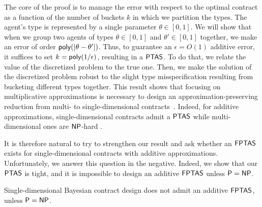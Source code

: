 The core of the proof is to manage the error with respect to the optimal contract as a function of the number of buckets $k$ in which we partition the types.
The agent's type is represented by a single parameter $\theta\in [0,1]$. 
We will show that when we group two agents of types $\theta \in [0,1]$ and $\theta'\in [0,1]$ together, we make an error of order $\textsf{poly}(|\theta-\theta'|)$. Thus, to guarantee an $\epsilon=O(1)$ additive error, it suffices to set $k=\textsf{poly}(1/\epsilon)$, resulting in a $\textsf{PTAS}$. 
To do that, we relate the value of the discretized problem to the true one. Then, we make the solution of the discretized problem robust to the slight type misspecification resulting from bucketing different types together.
%
%
This result shows that focusing on multiplicative approximations is necessary to design an approximation-preserving reduction from multi- to single-dimensional contracts~\citep{castiglioni2025reduction}. Indeed, for additive approximations, single-dimensional contracts admit a $\textsf{PTAS}$ while multi-dimensional ones are $\textsf{NP}$-hard \citep{guruganesh2021contracts, castiglioni2022bayesian}. 

It is therefore natural to try to strengthen our result and ask whether an $\textsf{FPTAS}$ exists for single-dimensional contracts with additive approximations. Unfortunately, we answer this question in the negative.
Indeed, we show that our $\textsf{PTAS}$ is tight, and it is impossible to design an additive $\textsf{FPTAS}$ unless $\textsf{P}=\textsf{NP}$.

\begin{theorem-non}
    Single-dimensional Bayesian contract design does not admit an additive $\textsf{FPTAS}$, unless $\textsf{P}=\textsf{NP}$.
\end{theorem-non}

